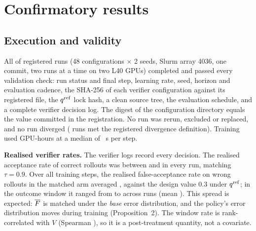 \section{Confirmatory results}\label{sec:results}

\subsection{Execution and validity}
All \GridValid{} of \GridRuns{} registered runs (48 configurations $\times$ 2 seeds, Slurm array 4036, one commit, two runs at a time on two L40 GPUs) completed and passed every validation check: run status and final step, learning rate, seed, horizon and evaluation cadence, the SHA-256 of each verifier configuration against its registered file, the $q^{\mathrm{ref}}$ lock hash, a clean source tree, the evaluation schedule, and a complete verifier decision log. The digest of the configuration directory equals the value committed in the registration. No run was rerun, excluded or replaced, and no run diverged (\Divergences{} runs met the registered divergence definition). Training used \GPUhours{} GPU-hours at a median of \StepSecMed{}~s per step.

\textbf{Realised verifier rates.} The verifier logs record every decision. The realised acceptance rate of correct rollouts was between \TaurealMin{} and \TaurealMax{} in every run, matching $\tau=0.9$. Over all training steps, the realised false-acceptance rate on wrong rollouts in the matched arm averaged \FrealAllMatched{}, against the design value 0.3 under $q^{\mathrm{ref}}$; in the outcome window it ranged from \FrealMatchedMin{} to \FrealMatchedMax{} across runs (mean \FrealMatchedMean). This spread is expected: $\overline{F}$ is matched under the \emph{base} error distribution, and the policy's error distribution moves during training (Proposition~2). The window rate is rank-correlated with $V$ (Spearman \SpearFrealV), so it is a post-treatment quantity, not a covariate.

